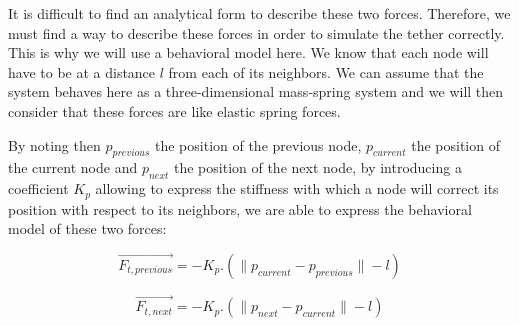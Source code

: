 It is difficult to find an analytical form to describe these two forces. Therefore, we must find a way to describe these forces in order to simulate the tether correctly. This is why we will use a behavioral model here. We know that each node will have to be at a distance $l$ from each of its neighbors. We can assume that the system behaves here as a three-dimensional mass-spring system and we will then consider that these forces are like elastic spring forces.

By noting then $p_{previous}$ the position of the previous node, $p_{current}$ the position of the current node and $p_{next}$ the position of the next node, by introducing a coefficient $K_p$ allowing to express the stiffness with which a node will correct its position with respect to its neighbors, we are able to express the behavioral model of these two forces:

$$\overrightarrow{F_{t, previous}} = -K_p.\left(\|p_{current} - p_{previous}\| - l\right)$$

$$\overrightarrow{F_{t, next}} = -K_p.\left(\|p_{next} - p_{current}\| - l\right)$$
